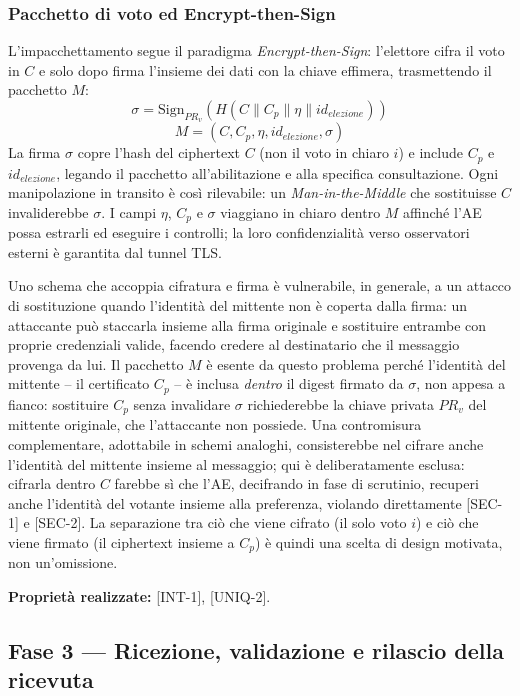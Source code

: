 \subsubsection{Pacchetto di voto ed Encrypt-then-Sign}
\label{subsubsec:wp2_encrypt_then_sign}

L'impacchettamento segue il paradigma \textit{Encrypt-then-Sign}: l'elettore cifra il voto in $C$ e solo dopo firma l'insieme dei dati con la chiave effimera, trasmettendo il pacchetto $M$:
$$\sigma = \text{Sign}_{PR_v}(H(C \parallel C_p \parallel \eta \parallel id_{elezione}))$$
$$M = (C, C_p, \eta, id_{elezione}, \sigma)$$
La firma $\sigma$ copre l'hash del ciphertext $C$ (non il voto in chiaro $i$) e include $C_p$ e $id_{elezione}$, legando il pacchetto all'abilitazione e alla specifica consultazione. Ogni manipolazione in transito è così rilevabile: un \textit{Man-in-the-Middle} che sostituisse $C$ invaliderebbe $\sigma$. I campi $\eta$, $C_p$ e $\sigma$ viaggiano in chiaro dentro $M$ affinché l'AE possa estrarli ed eseguire i controlli; la loro confidenzialità verso osservatori esterni è garantita dal tunnel TLS.

Uno schema che accoppia cifratura e firma è vulnerabile, in generale, a un attacco di sostituzione quando l'identità del mittente non è coperta dalla firma: un attaccante può staccarla insieme alla firma originale e sostituire entrambe con proprie credenziali valide, facendo credere al destinatario che il messaggio provenga da lui. Il pacchetto $M$ è esente da questo problema perché l'identità del mittente -- il certificato $C_p$ -- è inclusa \textit{dentro} il digest firmato da $\sigma$, non appesa a fianco: sostituire $C_p$ senza invalidare $\sigma$ richiederebbe la chiave privata $PR_v$ del mittente originale, che l'attaccante non possiede. Una contromisura complementare, adottabile in schemi analoghi, consisterebbe nel cifrare anche l'identità del mittente insieme al messaggio; qui è deliberatamente esclusa: cifrarla dentro $C$ farebbe sì che l'AE, decifrando in fase di scrutinio, recuperi anche l'identità del votante insieme alla preferenza, violando direttamente [SEC-1] e [SEC-2]. La separazione tra ciò che viene cifrato (il solo voto $i$) e ciò che viene firmato (il ciphertext insieme a $C_p$) è quindi una scelta di design motivata, non un'omissione.

\textbf{Proprietà realizzate:} [INT-1], [UNIQ-2].

\subsection{Fase 3 --- Ricezione, validazione e rilascio della ricevuta}
\label{subsec:wp2_fase_ricezione}

